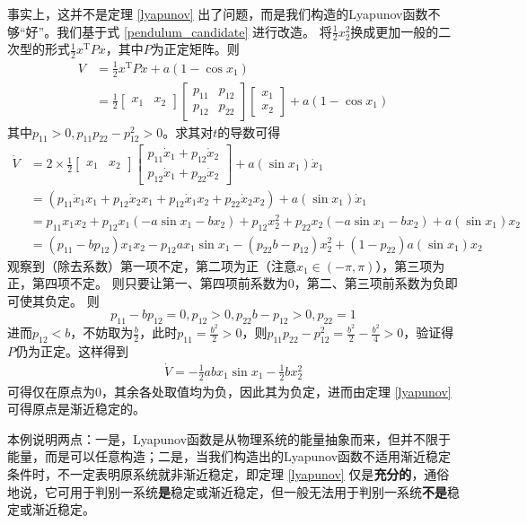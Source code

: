 \begin{example}[利用Lyapunov稳定性定理判别单摆系统稳定性]
事实上，这并不是定理 \ref{lyapunov} 出了问题，而是我们构造的Lyapunov函数不够“好”。我们基于式 \eqref{pendulum_candidate} 进行改造。
将$\frac12x_2^2$换成更加一般的二次型的形式$\frac12x^\mathrm{T}Px$，其中$P$为正定矩阵。则
\begin{align*}
  V&=\frac{1}{2}x^\mathrm{T}Px+a(1-\cos x_1)\\
  &=\frac{1}{2}\begin{bmatrix}
  x_1&x_2
  \end{bmatrix}\begin{bmatrix}
    p_{11}&p_{12}\\p_{12}&p_{22}
    \end{bmatrix}\begin{bmatrix}
      x_1\\x_2
      \end{bmatrix}+a(1-\cos x_1)
\end{align*}
其中$p_{11}>0,p_{11}p_{22}-p_{12}^2>0$。求其对$t$的导数可得\begin{align*}
  \dot{V}&=2\times \frac{1}{2}\begin{bmatrix}
    x_1&x_2
    \end{bmatrix}\begin{bmatrix}
      p_{11}\dot{x}_1+p_{12}\dot{x}_2\\p_{12}\dot{x}_1+p_{22}\dot{x}_2
      \end{bmatrix}+a(\sin x_1)\dot{x}_1\\
    &=\left(p_{11}\dot{x}_1x_1+p_{12}\dot{x}_2x_1+p_{12}\dot{x}_1x_2+p_{22}\dot{x}_2x_2\right)
        +a(\sin x_1)\dot{x}_1\\
      &=p_{11}x_1x_2+p_{12}x_1(-a\sin x_1-bx_2)+p_{12}x_2^2+p_{22}x_2(-a\sin x_1-bx_2)
      +a(\sin x_1)x_2\\
    &=(p_{11}-bp_{12})x_1x_2-p_{12}ax_1\sin x_1-(p_{22}b-p_{12})x_2^2+(1-p_{22})a(\sin x_1)x_2
\end{align*}
观察到（除去系数）第一项不定，第二项为正（注意$x_1\in(-\pi,\pi)$），第三项为正，第四项不定。
则只要让第一、第四项前系数为0，第二、第三项前系数为负即可使其负定。
则\[p_{11}-bp_{12}=0,p_{12}>0,p_{22}b-p_{12}>0,p_{22}=1\]
进而$p_{12}<b$，不妨取为$\frac{b}{2}$，此时$p_{11}=\frac{b^2}{2}>0$，则$p_{11}p_{22}-p_{12}^2=\frac{b^2}{2}-\frac{b^2}{4}>0$，验证得$P$仍为正定。这样得到
\begin{align*}
  \dot{V}=-\frac{1}{2}abx_1\sin x_1-\frac{1}{2}bx_2^2
\end{align*}
可得仅在原点为$0$，其余各处取值均为负，因此其为负定，进而由定理 \ref{lyapunov} 可得原点是渐近稳定的。

本例说明两点：一是，Lyapunov函数是从物理系统的能量抽象而来，但并不限于能量，而是可以任意构造；二是，当我们构造出的Lyapunov函数不适用渐近稳定条件时，不一定表明原系统就非渐近稳定，即定理 \ref{lyapunov} 仅是{\bf 充分的}，通俗地说，它可用于判别一系统{\bf 是}稳定或渐近稳定，但一般无法用于判别一系统{\bf 不是}稳定或渐近稳定。
\end{example}
